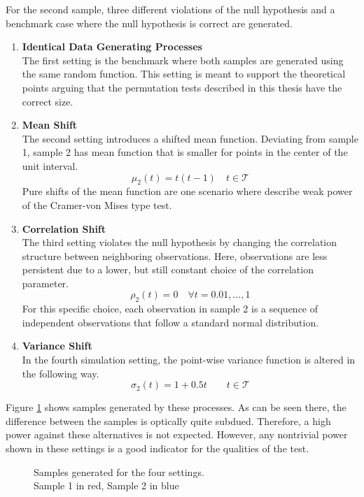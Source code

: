 \documentclass[12pt, a4paper]{article}
\theoremstyle{MAstyle} \newtheorem{assumption}{Assumption}[section]
\theoremstyle{MAstyle} \newtheorem{definition}{Definition}[section]
\theoremstyle{MAstyle} \newtheorem{theorem}{Theorem}[section]
\begin{document}
		For the second sample, three different violations of the null hypothesis and a benchmark case where the null hypothesis is correct are generated.
		\begin{enumerate}
			\item \textbf{Identical Data Generating Processes}\\
				  The first setting is the benchmark where both samples are generated using the same random function. This setting is meant to support the theoretical points arguing that the permutation tests described in this thesis have the correct size.
			\item \textbf{Mean Shift}\\
				  The second setting introduces a shifted mean function. Deviating from sample 1, sample 2 has mean function that is smaller for points in the center of the unit interval.
				  $$\mu_2(t) = t (t-1) \quad t \in \mathcal{T}$$
				  Pure shifts of the mean function are one scenario where \cite{bugni_permutation_2021} describe weak power of the Cramer-von Mises type test. 
			\newpage
			\item \textbf{Correlation Shift}\\
			 	  The third setting violates the null hypothesis by changing the correlation structure between neighboring observations. Here, observations are less persistent due to a lower, but still constant choice of the correlation parameter.
			 	  $$\rho_2(t) = 0 \quad \forall t = 0.01, \dots, 1$$
			 	  For this specific choice, each observation in sample 2 is a sequence of independent observations that follow a standard normal distribution.
			\item \textbf{Variance Shift}\\
				  In the fourth simulation setting, the point-wise variance function is altered in the following way.
				  $$\sigma_2(t) = 1 + 0.5t \quad \quad t \in \mathcal{T}$$
		\end{enumerate}
	
		Figure \ref{settings} shows samples generated by these processes. As can be seen there, the difference between the samples is optically quite subdued. Therefore, a high power against these alternatives is not expected. However, any nontrivial power shown in these settings is a good indicator for the qualities of the test.
		\begin{figure}[H]
			\caption{Samples generated for the four settings. \\
			Sample 1 in red, Sample 2 in blue}
			\label{settings}
		\end{figure}
		
\end{document}
